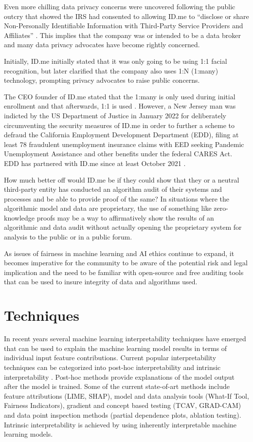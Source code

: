\documentclass[conference]{IEEEtran}
\begin{document}
Even more chilling data privacy concerns were uncovered following the public outcry that showed the IRS had consented to allowing ID.me to “disclose or share Non-Personally Identifiable Information with Third-Party Service Providers and Affiliates” \cite{b11}. This implies that the company was or intended to be a data broker and many data privacy advocates have become rightly concerned.

Initially, ID.me initially stated that it was only going to be using 1:1 facial recognition, but later clarified that the company also uses 1:N (1:many) technology, prompting privacy advocates to raise public concerns. \cite{b12}

The CEO founder of ID.me stated that the 1:many is only used during initial enrollment and that afterwards, 1:1 is used \cite{b13}. However, a New Jersey man was indicted by the US Department of Justice in January 2022 for deliberately circumventing the security measures of ID.me in order to further a scheme to defraud the California Employment Development Department (EDD), filing at least 78 fraudulent unemployment insurance claims with EED seeking Pandemic Unemployment Assistance and other benefits under the federal CARES Act. EDD has partnered with ID.me since at least October 2021 \cite{b13}.

How much better off would ID.me be if they could show that they or a neutral third-party entity has conducted an algorithm audit of their systems and processes and be able to provide proof of the same?
In situations where the algorithmic model and data are proprietary, the use of something like zero-knowledge proofs may be a way to affirmatively show the results of an algorithmic and data audit without actually opening the proprietary system for analysis to the public or in a public forum.

As issues of fairness in machine learning and AI ethics continue to expand, it becomes imperative for the community to be aware of the potential risk and legal implication and the need to be familiar with open-source and free auditing tools that can be used to insure integrity of data and algorithms used.

\section{Techniques}

In recent years several machine learning interpretability techniques have emerged that can be used to explain the machine learning model results in terms of individual input feature contributions. Current popular interpretability techniques can be categorized into post-hoc interpretability and intrinsic interpretability \cite{b14}. Post-hoc methods provide explanations of the model output after the model is trained. Some of the current state-of-art methods include feature attributions (LIME, SHAP), model and data analysis tools (What-If Tool, Fairness Indicators), gradient and concept based testing (TCAV, GRAD-CAM) and data point inspection methods (partial dependence plots, ablation testing). Intrinsic interpretability is achieved by using inherently interpretable machine learning models.
\end{document}
